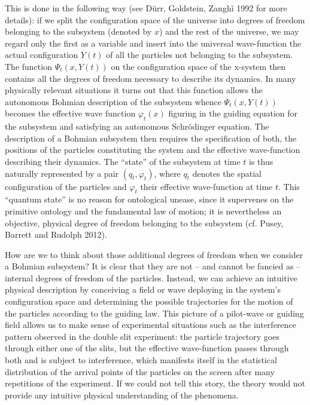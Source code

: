 \documentclass[12pt]{article}
\theoremstyle{definition}
\begin{document}
This is done in the following way (see D\"urr, Goldstein, Zangh\`i 1992 for more details): if we split the configuration space of the universe into degrees of freedom belonging to the subsystem (denoted by $x$) and the rest of the universe, we may regard only the first as a variable and insert into the universal wave-function the actual configuration $Y(t)$ of all the particles not belonging to the subsystem. The function $\Psi_t(x,Y(t))$ on the configuration space of the x-system then contains all the degrees of freedom necessary to describe its dynamics. In many physically relevant situations it turns out that this function allows the autonomous Bohmian description of the subsystem whence $\Psi_t(x,Y(t))$ becomes the effective wave function $\varphi_t(x)$ figuring in the guiding equation for the subsystem and satisfying an autonomous Schr\"odinger equation. The description of a Bohmian subsystem then requires the specification of both, the positions of the particles constituting the system and the effective wave-function describing their dynamics. The ``state'' of the subsystem at time $t$ is thus naturally represented by a pair $(q_t, \varphi_t)$, where $q_t$ denotes the spatial configuration of the particles and $\varphi_t$ their effective wave-function at time $t$. This ``quantum state'' is no reason for ontological unease, since it supervenes on the primitive ontology and the fundamental law of motion; it is nevertheless an objective, physical degree of freedom belonging to the subsystem (cf. Pusey, Barrett and Rudolph 2012).

How are we to think about those additional degrees of freedom when we consider a Bohmian subsystem? It is clear that they are not -- and cannot be fancied as -- internal degrees of freedom of the particles. Instead, we can achieve an intuitive physical description by conceiving a field or wave deploying in the system's configuration space and determining the possible trajectories for the motion of the particles according to the guiding law. This picture of a pilot-wave or guiding field allows us to make sense of experimental situations such as the interference pattern observed in the double slit experiment: the particle trajectory goes through either one of the slits, but the effective wave-function passes through both and is subject to interference, which manifests itself in the statistical distribution of the arrival points of the particles on the screen after many repetitions of the experiment. If we could not tell this story, the theory would not provide any intuitive physical understanding of the phenomena.
\end{document}
